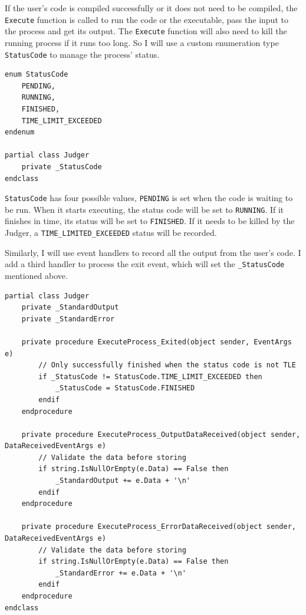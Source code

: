 \documentclass[a4paper]{report}
\begin{document}
If the user's code is compiled successfully or it does not need to be compiled, the \texttt{Execute} function is called to run the code or the executable, pass the input to the process and get its output. The \texttt{Execute} function will also need to kill the running process if it runs too long. So I will use a custom enumeration type \texttt{StatusCode} to manage the process' status.

\begin{verbatim}
enum StatusCode
    PENDING,
    RUNNING,
    FINISHED,
    TIME_LIMIT_EXCEEDED
endenum

partial class Judger
    private _StatusCode
endclass
\end{verbatim}

\texttt{StatusCode} has four possible values, \texttt{PENDING} is set when the code is waiting to be run. When it starts executing, the status code will be set to \texttt{RUNNING}. If it finishes in time, its status will be set to \texttt{FINISHED}. If it needs to be killed by the Judger, a \texttt{TIME_LIMITED_EXCEEDED} status will be recorded.

Similarly, I will use event handlers to record all the output from the user's code. I add a third handler to process the exit event, which will set the \texttt{_StatusCode} mentioned above.

\begin{verbatim}
partial class Judger
    private _StandardOutput
    private _StandardError

    private procedure ExecuteProcess_Exited(object sender, EventArgs e)
        // Only successfully finished when the status code is not TLE
        if _StatusCode != StatusCode.TIME_LIMIT_EXCEEDED then
            _StatusCode = StatusCode.FINISHED
        endif
    endprocedure

    private procedure ExecuteProcess_OutputDataReceived(object sender, DataReceivedEventArgs e)
        // Validate the data before storing
        if string.IsNullOrEmpty(e.Data) == False then
            _StandardOutput += e.Data + '\n'
        endif
    endprocedure

    private procedure ExecuteProcess_ErrorDataReceived(object sender, DataReceivedEventArgs e)
        // Validate the data before storing
        if string.IsNullOrEmpty(e.Data) == False then
            _StandardError += e.Data + '\n'
        endif
    endprocedure
endclass
\end{verbatim}
\end{document}
